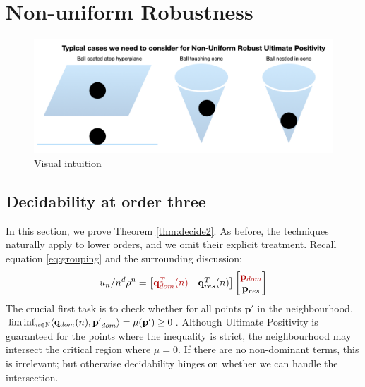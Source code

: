 \section{Non-uniform Robustness}

\begin{figure}[h]

\includegraphics[width=\textwidth]{picture1.png}
\caption{Visual intuition}
\label{fig:geometricpicture}
\end{figure}
\subsection{Decidability at order three}
\label{section:decidability2}
In this section, we prove Theorem \ref{thm:decide2}. As before, the techniques naturally apply to lower orders, and we omit their explicit treatment. Recall equation \ref{eq:grouping} and the surrounding discussion:
\begin{equation}
u_n/n^d\rho^n = \begin{bmatrix}
{\color{red!70!black} \mathbf{q}_{dom}^T(n) } & \mathbf{q}_{res}^T(n)
\end{bmatrix}
\begin{bmatrix}
{\color{red!70!black} \mathbf{p}_{dom}} \\
\mathbf{p}_{res}
\end{bmatrix}
\end{equation}
The crucial first task is to check whether for all points $\mathbf{p'}$ in the neighbourhood, \\$\liminf_{n\in\mathbb{N}}\langle\mathbf{q}_{dom}(n), \mathbf{p'}_{dom}\rangle = \mu(\mathbf{p'}) \ge 0$. Although Ultimate Positivity is guaranteed for the points where the inequality is strict, the neighbourhood may intersect the critical region where $\mu = 0$. If there are no non-dominant terms, this is irrelevant; but otherwise decidability hinges on whether we can handle the intersection.

